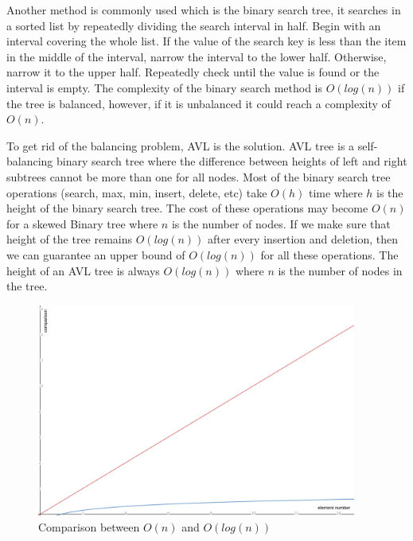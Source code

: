 
Another method is commonly used which is the binary search tree, it searches in a sorted list by
repeatedly dividing the search interval in half. Begin with an interval covering the whole list. If the
value of the search key is less than the item in the middle of the interval, narrow the interval to the
lower half. Otherwise, narrow it to the upper half. Repeatedly check until the value is found or the
interval is empty. The complexity of the binary search method is $O(log(n))$ if the tree is balanced, however,
if it is unbalanced it could reach a complexity of $O(n)$.


To get rid of the balancing problem, AVL is the solution. AVL tree is a self-balancing binary
search tree where the difference between heights of left and right subtrees cannot be more than one
for all nodes. Most of the binary search tree operations (search, max, min, insert, delete, etc) take
$O(h)$ time where $h$ is the height of the binary search tree. The cost of these operations may become
$O(n)$ for a skewed Binary tree where $n$ is the number of nodes. If we make sure that height of the tree remains $O(log(n))$ after every
insertion and deletion, then we can guarantee an upper bound of $O(log(n))$ for all these operations.
The height of an AVL tree is always $O(log(n))$ where $n$ is the number of nodes in the tree.

\begin{figure}[H]
\centering
\includegraphics[height=7cm]{figures/design/comparison_between_search_methods.png}
\caption{Comparison between $O(n)$ and $O(log(n))$}\label{comparison_between_search_methods}
\end{figure}

